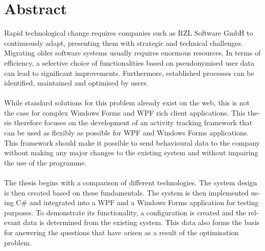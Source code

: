\chapter{Abstract}


\begin{english} %
Rapid technological change requires companies such as RZL Software GmbH to continuously adapt, presenting them with strategic and technical challenges. Migrating older software systems usually requires enormous resources. In terms of efficiency, a selective choice of functionalities based on pseudonymised user data can lead to significant improvements. Furthermore, established processes can be identified, maintained and optimised by users.\\
\\
While standard solutions for this problem already exist on the web, this is not the case for complex Windows Forms and WPF rich client applications. This thesis therefore focuses on the development of an activity tracking framework that can be used as flexibly as possible for WPF and Windows Forms applications. This framework should make it possible to send behavioural data to the company without making any major changes to the existing system and without impairing the use of the programme.\\
\\
The thesis begins with a comparison of different technologies. The system design is then created based on these fundamentals. The system is then implemented using C\# and integrated into a WPF and a Windows Forms application for testing purposes. To demonstrate its functionality, a configuration is created and the relevant data is determined from the existing system. This data also forms the basis for answering the questions that have arisen as a result of the optimisation problem.
\end{english}

